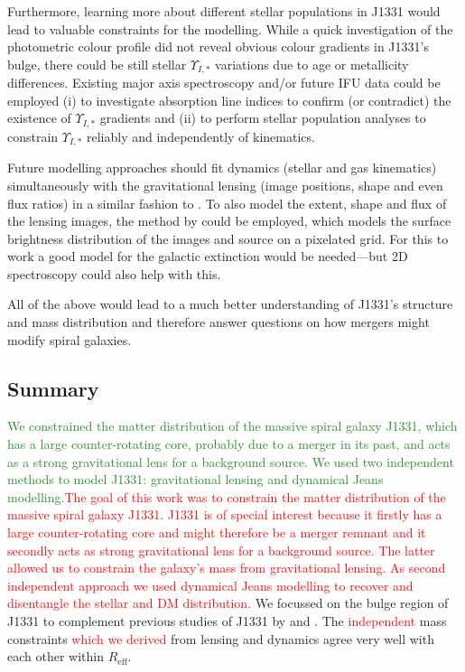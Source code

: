 \documentclass[useAMS,usenatbib]{mnras}
\newcommand{\NEW}[1]{\textcolor{ForestGreen}{#1}}
\newcommand{\OLD}[1]{\textcolor{Red}{#1}}
\begin{document}
Furthermore, learning more about different stellar populations in J1331 would lead to valuable constraints for the modelling. While a quick investigation of the photometric colour profile did not reveal obvious colour gradients in J1331's bulge, there could be still stellar $\Upsilon_{I,*}$ variations due to age or metallicity differences. Existing major axis spectroscopy and/or future IFU data could be employed (i) to investigate absorption line indices to confirm (or contradict) the existence of $\Upsilon_{I,*}$ gradients and (ii) to perform stellar population analyses to constrain $\Upsilon_{I,*}$ reliably and independently of kinematics.

Future modelling approaches should fit dynamics (stellar and gas kinematics) simultaneously with the gravitational lensing (image positions, shape and even flux ratios) in a similar fashion to \citet{SWELLSIV}. To also model the extent, shape and flux of the lensing images, the method by \citet{2004ApJ...611..739T,2003ApJ...590..673W} could be employed, which models the surface brightness distribution of the images and source on a pixelated grid. For this to work a good model for the galactic extinction would be needed---but 2D spectroscopy could also help with this.

All of the above would lead to a much better understanding of J1331's structure and mass distribution and therefore answer questions on how mergers might modify spiral galaxies.

\subsection{Summary}

\NEW{We constrained the matter distribution of the massive spiral galaxy J1331, which has a large counter-rotating core, probably due to a merger in its past, and acts as a strong gravitational lens for a background source. We used two independent methods to model J1331: gravitational lensing and dynamical Jeans modelling.}\OLD{The goal of this work was to constrain the matter distribution of the massive spiral galaxy J1331. J1331 is of special interest because it firstly has a large counter-rotating core and might therefore be a merger remnant and it secondly acts as strong gravitational lens for a background source. The latter allowed us to constrain the galaxy's mass from gravitational lensing. As second independent approach we used dynamical Jeans modelling to recover and disentangle the stellar and DM distribution.} We focussed on the bulge region of J1331 to complement previous studies of J1331 by \citet{SWELLSIII} and \citet{SWELLSV}. The \OLD{independent} mass constraints \OLD{which we derived} from lensing and dynamics agree very well with each other within $R_\text{eff}$.
\end{document}
